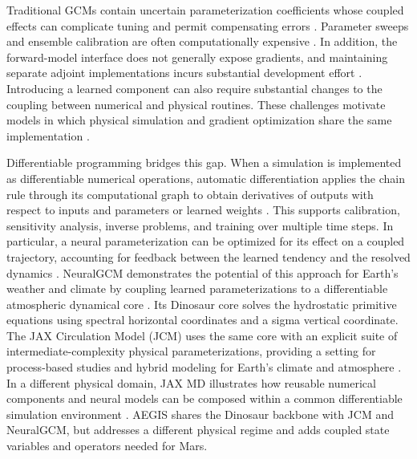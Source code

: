 \documentclass{article} %
\begin{document}
Traditional GCMs contain uncertain parameterization coefficients whose
coupled effects can complicate tuning and permit compensating errors
\citep{forget1999}. Parameter sweeps and ensemble calibration are often computationally expensive \citep{cleary2020augmented}. In addition, the forward-model interface does not generally expose gradients, and maintaining separate adjoint implementations incurs substantial development effort \citep{giering1998}. Introducing a learned component can also require substantial changes to the coupling between numerical and physical routines. These challenges motivate models in which physical simulation and gradient optimization share the same implementation \citep{davenport2026}.

Differentiable programming bridges this gap. When a simulation is
implemented as differentiable numerical operations, automatic differentiation applies the chain rule through its computational graph to obtain derivatives of outputs with respect to inputs and parameters or learned weights \citep{baydin2018autodiff}. This supports calibration, sensitivity analysis, inverse problems, and training over multiple time steps. In particular, a neural parameterization can be optimized for its effect on a coupled trajectory, accounting for feedback between the learned tendency and the resolved dynamics \citep{rasp2020, kashyap2024modelingchaoticlorenzode}. NeuralGCM demonstrates the potential of this approach for Earth's weather and climate by coupling learned parameterizations to a differentiable atmospheric dynamical core \citep{kochkov2024}. Its Dinosaur core solves the hydrostatic primitive equations using spectral horizontal coordinates and a sigma vertical coordinate. The JAX Circulation Model (JCM) uses the same core with an explicit suite of intermediate-complexity physical parameterizations, providing a setting for process-based studies and hybrid modeling for Earth's climate and atmosphere \citep{gelbrecht2023differentiable, davenport2026}. In a different physical domain, JAX MD illustrates how reusable numerical components and neural models can be composed within a common differentiable simulation environment \citep{schoenholz2020}. AEGIS shares the Dinosaur backbone with JCM and NeuralGCM, but addresses a different physical regime and adds coupled state variables and operators needed for Mars.

\end{document}
